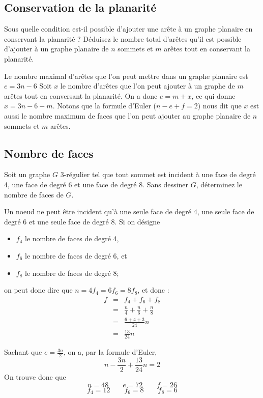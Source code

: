 \subsection{Conservation de la planarité}
Sous quelle condition est-il possible d’ajouter une arête à un graphe planaire en conservant la planarité ? Déduisez le nombre total d’arêtes qu’il est possible d’ajouter à un graphe planaire de $n$ sommets et $m$ arêtes tout en conservant la planarité.

\begin{solution} Le nombre maximal d'arêtes que l'on peut mettre dans un graphe planaire est $e = 3n - 6$ Soit $x$ le nombre d'arêtes que l'on peut ajouter à un graphe de $m$ arêtes tout en conversant la planarité. On a donc $e = m + x$, ce qui donne $x = 3n - 6 - m$. Notons que la formule d'Euler ($ n - e + f = 2$) nous dit que $x$ est aussi le nombre maximum de faces que l'on peut ajouter au graphe planaire de $n$ sommets et $m$ arêtes. 
\end{solution}

\subsection{Nombre de faces}
Soit un graphe $G$ 3-régulier tel que tout sommet est incident à une face de degré 4, une face de degré 6 et une face de degré 8. Sans dessiner $G$, déterminez le nombre de faces de $G$.

\begin{solution} Un noeud ne peut être incident qu'à une seule face de degré 4, une seule face de degré 6 et une seule face de degré 8. Si on désigne
\begin{itemize}
\item $f_4$ le nombre de faces de degré 4,
\item $f_6$ le nombre de faces de degré 6, et
\item $f_8$ le nombre de faces de degré 8;
\end{itemize}
on peut donc dire que $n = 4f_4 = 6f_6 = 8f_8$, et donc : 
\[  
\begin{array}{rcl}
f &=& f_4 + f_6 + f_8 \\
  &=& \frac{n}{4} + \frac{n}{6} + \frac{n}{8} \\
  &=& \frac{6 + 4 + 3}{24} n \\
  &=& \frac{13}{24} n 
\end{array}
\]

Sachant que $e = \frac{3n}{2}$, on a, par la formule d'Euler, $$ n - \frac{3n}{2} + \frac{13}{24} n = 2 $$
On trouve donc que $$ n = 48 \qquad e = 72 \qquad f = 26$$
$$ f_4 = 12 \qquad f_6 = 8 \qquad f_8 = 6$$
\end{solution}

